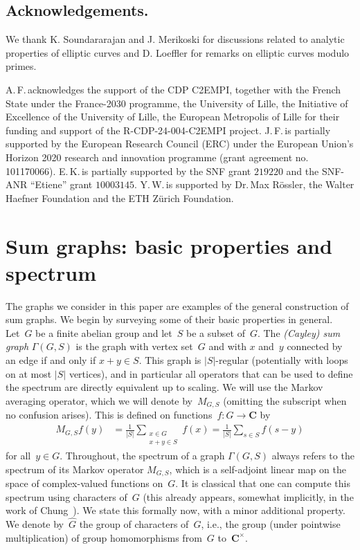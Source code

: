 \documentclass[12pt]{amsart}
\numberwithin{equation}{section}
\newcommand{\Cc}{\mathbf{C}}
\theoremstyle{plain}
\theoremstyle{remark}
\theoremstyle{definition}
\newcommand{\abs}[1]{\left\lvert#1\right\rvert}
\begin{document}
\subsection*{Acknowledgements.}  We thank K. Soundararajan and
J. Merikoski for discussions related to analytic properties of
elliptic curves and D. Loeffler for remarks on elliptic curves modulo
primes.

A.\,F.\,acknowledges the support of the CDP C2EMPI, together with the
French State under the France-2030 programme, the University of Lille,
the Initiative of Excellence of the University of Lille, the European
Metropolis of Lille for their funding and support of the
R\nobreakdash-CDP-24-004-C2EMPI project. J.\,F.\,is partially supported by the
European Research Council (ERC) under the European Union's Horizon
2020 research and innovation programme (grant agreement
no.\,101170066). E.\,K.\,is partially supported by the SNF grant
$219220$ and the SNF\nobreakdash-ANR ``Etiene'' grant
$10003145$. Y.\,W.\,is supported by Dr.\,Max R\"ossler, the Walter
Haefner Foundation and the ETH Z\"urich Foundation.


\section{Sum graphs: basic properties and spectrum}

The graphs we consider in this paper are examples of the general construction of sum graphs.  We begin by surveying some of their basic properties in
general. Let~$G$ be a finite abelian group and let~$S$ be a subset
of~$G$.  The \emph{(Cayley) sum graph} $\Gamma(G,S)$ is the graph with
vertex set~$G$ and with $x$ and~$y$ connected by an edge if and only if
$x+y\in S$. This graph is $|S|$-regular (potentially with loops on at
most $\abs S$ vertices), and in particular all operators that can be
used to define the spectrum are directly equivalent up to scaling. We
will use the Markov averaging operator, which we will denote
by~$M_{G,S}$ (omitting the subscript when no confusion arises). This is
defined on functions~$f\colon G\to \Cc$ by
\begin{align*}
  M_{G,S}f(y)&=\frac{1}{|S|}\sum_{\substack{x\in G\\x+y\in S}}f(x)=
  \frac{1}{|S|}\sum_{s\in S}f(s-y)
\end{align*}
for all~$y\in G$. Throughout, the spectrum of a graph $\Gamma(G,S)$ always
refers to the spectrum of its Markov operator $M_{G,S}$, which is a
self-adjoint linear map on the space of complex-valued functions on~$G$. It is classical that one can compute this spectrum 
using characters of~$G$ (this already appears, somewhat implicitly, in the work of Chung~\cite{chung}). We state this formally now,
with a minor additional property.  We denote by~$\widehat{G}$ the group
of characters of~$G$, i.e., the group (under pointwise multiplication)
of group homomorphisms from~$G$ to~$\Cc^{\times}$.
\end{document}
